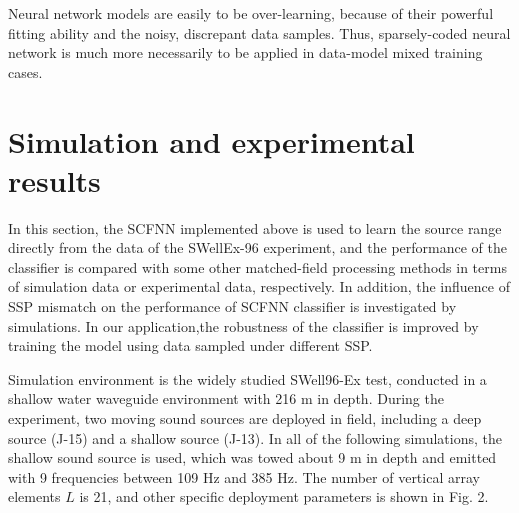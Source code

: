 Neural network models are easily to be over-learning, because of their powerful fitting ability and the noisy, discrepant data samples. Thus, sparsely-coded neural network is much more necessarily to be applied in data-model mixed training cases.

\section{Simulation and experimental results}
In this section, the SCFNN implemented above is used to learn the source range directly from the data of the SWellEx-96 experiment, and the performance of the classifier is compared with some other matched-field processing methods in terms of simulation data or experimental data, respectively. In addition, the influence of SSP mismatch on the performance of SCFNN classifier is investigated by simulations. In our application,the robustness of the classifier is improved by training the model using data sampled under different SSP.

Simulation environment is the widely studied SWell96-Ex test, conducted in a shallow water waveguide environment with 216 m in depth.
During the experiment, two moving sound sources are deployed in field, including a deep source (J-15) and a shallow source (J-13). In all of the following simulations, the shallow sound source is used, which was towed about 9 m in depth and emitted with 9 frequencies between 109 Hz and 385 Hz. The number of vertical array elements $L$ is 21, and other specific deployment parameters is shown in Fig. 2.

